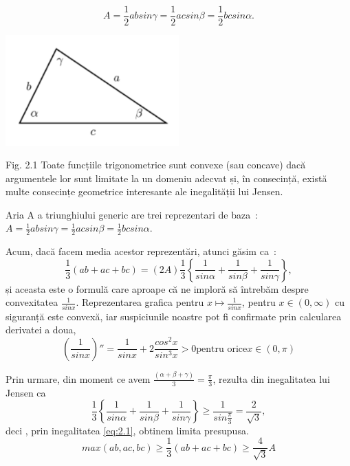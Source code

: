 \documentclass[a4paper,12pt,oneside]{report}
\begin{document}
\begin{displaymath}
  A = \frac{1}{2}ab sin\gamma = \frac{1}{2}ac sin \beta = \frac{1}{2}bc sin \alpha. 
\end{displaymath}

\begin{center}
	\includegraphics[width=0.5\textwidth]{fig2.1.png}
\end{center}

Fig. 2.1  Toate funcțiile trigonometrice sunt convexe (sau concave) dacă
argumentele lor sunt limitate la un domeniu adecvat și, în consecință,
există multe consecințe geometrice interesante ale inegalității lui Jensen.

Aria A a triunghiului generic are trei reprezentari de baza :
\(A = \frac{1}{2}ab sin\gamma = \frac{1}{2}ac sin \beta = \frac{1}{2}bc sin \alpha. \)

Acum, dacă facem media acestor reprezentări, atunci găsim ca :
\begin{displaymath}
  \frac{1}{3}\left ( ab + ac + bc \right )= \left ( 2A \right )\frac{1}{3}\left \{ \frac{1}{sin \alpha } + \frac{1}{sin \beta } + \frac{1}{sin \gamma }\right \}, \label{eq:2.1} \tag{2.1}
\end{displaymath}
și aceasta este o formulă care aproape că ne imploră să întrebăm despre convexitatea \(\frac{1}{sin x}\). Reprezentarea grafica pentru \(x \mapsto \frac{1}{sin x}\), pentru \(x\in \left ( 0 , \infty  \right )\) cu siguranță este convexă, iar suspiciunile noastre pot fi confirmate prin calcularea derivatei a doua, 
\begin{displaymath}
  {\left ( \frac{1}{sin x} \right )}''= \frac{1}{sin x} + 2\frac{cos^{2}x}{sin ^{3}x}> 0 \text{pentru orice} x\in \left ( 0, \pi  \right )  \label{eq:2.2} \tag{2.2}
\end{displaymath}

	Prin urmare, din moment ce avem \(\frac{\left ( \alpha + \beta  + \gamma  \right )}{3}= \frac{\pi }{3}\), rezulta din inegalitatea lui Jensen ca 
\begin{displaymath}
  \frac{1}{3}\left \{ \frac{1}{sin \alpha }  + \frac{1}{sin \beta } + \frac{1}{sin \gamma }\right \}\geq \frac{1}{sin \frac{\pi }{3}} =  \frac{2}{\sqrt{3}}, 
\end{displaymath}
deci , prin inegalitatea \ref{eq:2.1}, obtinem limita presupusa. 
\begin{displaymath}
  max \left ( ab, ac, bc \right )\geq \frac{1}{3}\left ( ab + ac + bc \right )\geq \frac{4}{\sqrt{3}}A \label{eq:2.3} \tag{2.3}
\end{displaymath}
\end{document}
